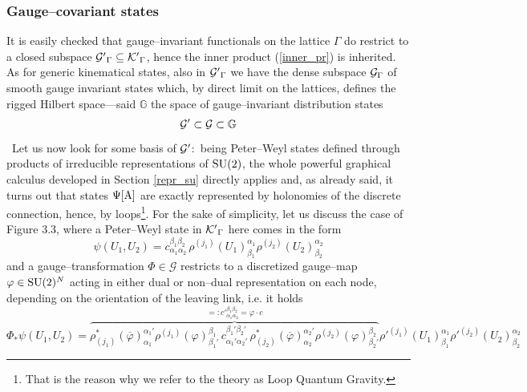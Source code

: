 \subsubsection{Gauge--covariant states}
It is easily checked that gauge--invariant functionals on the lattice $\Gamma$ do restrict to a closed subspace ${\mathcal{G}'}_\Gamma\subseteq{\mathcal{K}'}_\Gamma$, hence the inner product (\ref{inner_pr}) is inherited. As for generic kinematical states, also in ${\mathcal{G}'}_\Gamma$ we have the dense subspace $\mathcal{G}_\Gamma$ of smooth gauge invariant states which, by direct limit on the lattices, defines the rigged Hilbert space---said $\mathbb{G}$ the space of gauge--invariant distribution states
$$\mathcal{G}'\subset{\mathcal{G}}\subset\mathbb{G}$$
\,\newline
Let us now look for some basis of $\mathcal{G}'$:\, being Peter--Weyl states defined through products of irreducible representations of $\text{\normalfont SU}(2)$, the whole powerful graphical calculus developed in Section \ref{repr_su} directly applies and, as already said, it turns out that states $\Psi[\text{\normalfont A}]$ are exactly represented by holonomies of the discrete connection, hence, by loops\footnote{That is the reason why we refer to the theory as Loop Quantum Gravity.}. For the sake of simplicity, let us discuss the case of Figure 3.3, where a Peter--Weyl state in ${\mathcal{K}'}_\Gamma$ here comes in the form%
$$\psi(U_1,U_2)=c^{\beta_1\beta_2}_{\alpha_1\alpha_2}\,\rho^{(j_1)}(U_1)^{\alpha_1}_{\beta_1}\rho^{(j_2)}(U_2)^{\alpha_2}_{\beta_2}$$
and a gauge--transformation $\Phi\in\mathscr{G}$ restricts to a discretized gauge--map $\varphi\in\text{\normalfont SU}(2)^N$ acting in either dual or non--dual representation on each node, depending on the orientation of the leaving link, i.e. it holds
$$\Phi_*\psi(U_1,U_2)=\overbrace{\rho^*_{(j_1)}(\overline{\varphi})^{{\alpha_1}'}_{\alpha_1}\rho^{(j_1)}(\varphi)^{\beta_1}_{{\beta_1}'}\,c^{{\beta_1}'{\beta_2}'}_{{\alpha_1}'{\alpha_2}'}\,\rho^*_{(j_2)}(\overline{\varphi})^{{\alpha_2}'}_{\alpha_2}\rho^{(j_2)}(\varphi)^{\beta_2}_{{\beta_2}'}}^{=:{c'}^{\beta_1\beta_2}_{\alpha_1\alpha_2}=\varphi\cdot c}{\rho'}^{(j_1)}(U_1)^{\alpha_1}_{\beta_1}{\rho'}^{(j_2)}(U_2)^{\alpha_2}_{\beta_2}$$

